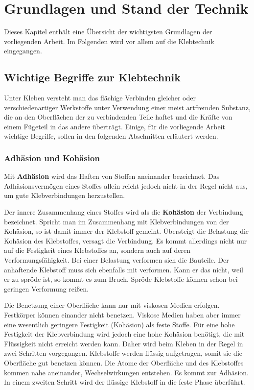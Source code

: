 \chapter{Grundlagen und Stand der Technik}
\label{sec:Grundlage}
Dieses Kapitel enthält eine Übersicht der wichtigsten Grundlagen der vorliegenden Arbeit. Im Folgenden wird vor allem auf die Klebtechnik eingegangen.
\section{Wichtige Begriffe zur Klebtechnik}
\label{sec:Klebtechnik}
Unter Kleben versteht man das flächige Verbinden gleicher oder verschiedenartiger Werkstoffe unter Verwendung einer meist artfremden Substanz, die an den Oberflächen der zu verbindenden Teile haftet und die Kräfte von einem Fügeteil in das andere überträgt. Einige, für die vorliegende Arbeit wichtige Begriffe, sollen in den folgenden Abschnitten erläutert werden.

\subsection{Adhäsion und Kohäsion}

Mit {\bf Adhäsion} wird das Haften von Stoffen aneinander bezeichnet. Das Adhäsionsvermögen eines Stoffes allein reicht jedoch nicht in der Regel nicht aus, um gute Klebverbindungen herzustellen.

Der innere Zusammenhang eines Stoffes wird als die {\bf Kohäsion} der Verbindung bezeichnet. Spricht man im Zusammenhang mit Klebverbindungen von der Kohäsion, so ist damit immer der Klebstoff gemeint. Übersteigt die Belastung die Kohäsion des Klebstoffes, versagt die Verbindung. Es kommt allerdings nicht nur auf die Festigkeit eines Klebstoffes an, sondern auch auf deren Verformungsfähigkeit. Bei einer Belastung verformen sich die Bauteile. Der anhaftende Klebstoff muss sich ebenfalls mit verformen. Kann er das nicht, weil er zu spröde ist, so kommt es zum Bruch. Spröde Klebstoffe können schon bei geringen Verformung reißen.

Die Benetzung einer Oberfläche kann nur mit viskosen Medien erfolgen. Festkörper können einander nicht benetzen. Viskose Medien haben aber immer eine wesentlich geringere Festigkeit (Kohäsion) als feste Stoffe. Für eine hohe Festigkeit der Klebverbindung wird jedoch eine hohe Kohäsion benötigt, die mit Flüssigkeit nicht erreicht werden kann. Daher wird beim Kleben in der Regel in zwei Schritten vorgegangen. Klebstoffe werden flüssig aufgetragen, somit sie die Oberfläche gut benetzen können. Die Atome der Oberfläche und des Klebstoffes kommen nahe aneinander, Wechselwirkungen entstehen. Es kommt zur Adhäsion. In einem zweiten Schritt wird der flüssige Klebstoff in die feste Phase überführt. 

